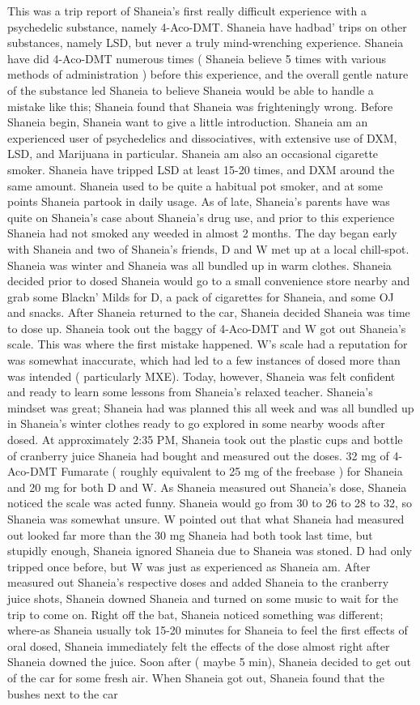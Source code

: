 \documentclass[12pt]{book}
\begin{document}
This was a trip report of Shaneia's first really difficult experience with a psychedelic substance, namely 4-Aco-DMT. Shaneia have hadbad' trips on other substances, namely LSD, but never a truly mind-wrenching experience. Shaneia have did 4-Aco-DMT numerous times ( Shaneia believe 5 times with various methods of administration ) before this experience, and the overall gentle nature of the substance led Shaneia to believe Shaneia would be able to handle a mistake like this; Shaneia found that Shaneia was frighteningly wrong. Before Shaneia begin, Shaneia want to give a little introduction. Shaneia am an experienced user of psychedelics and dissociatives, with extensive use of DXM, LSD, and Marijuana in particular. Shaneia am also an occasional cigarette smoker. Shaneia have tripped LSD at least 15-20 times, and DXM around the same amount. Shaneia used to be quite a habitual pot smoker, and at some points Shaneia partook in daily usage. As of late, Shaneia's parents have was quite on Shaneia's case about Shaneia's drug use, and prior to this experience Shaneia had not smoked any weeded in almost 2 months. The day began early with Shaneia and two of Shaneia's friends, D and W met up at a local chill-spot. Shaneia was winter and Shaneia was all bundled up in warm clothes. Shaneia decided prior to dosed Shaneia would go to a small convenience store nearby and grab some Blackn' Milds for D, a pack of cigarettes for Shaneia, and some OJ and snacks. After Shaneia returned to the car, Shaneia decided Shaneia was time to dose up. Shaneia took out the baggy of 4-Aco-DMT and W got out Shaneia's scale. This was where the first mistake happened. W's scale had a reputation for was somewhat inaccurate, which had led to a few instances of dosed more than was intended ( particularly MXE). Today, however, Shaneia was felt confident and ready to learn some lessons from Shaneia's relaxed teacher. Shaneia's mindset was great; Shaneia had was planned this all week and was all bundled up in Shaneia's winter clothes ready to go explored in some nearby woods after dosed. At approximately 2:35 PM, Shaneia took out the plastic cups and bottle of cranberry juice Shaneia had bought and measured out the doses. 32 mg of 4-Aco-DMT Fumarate ( roughly equivalent to 25 mg of the freebase ) for Shaneia and 20 mg for both D and W. As Shaneia measured out Shaneia's dose, Shaneia noticed the scale was acted funny. Shaneia would go from 30 to 26 to 28 to 32, so Shaneia was somewhat unsure. W pointed out that what Shaneia had measured out looked far more than the 30 mg Shaneia had both took last time, but stupidly enough, Shaneia ignored Shaneia due to Shaneia was stoned. D had only tripped once before, but W was just as experienced as Shaneia am. After measured out Shaneia's respective doses and added Shaneia to the cranberry juice shots, Shaneia downed Shaneia and turned on some music to wait for the trip to come on. Right off the bat, Shaneia noticed something was different; where-as Shaneia usually tok 15-20 minutes for Shaneia to feel the first effects of oral dosed, Shaneia immediately felt the effects of the dose almost right after Shaneia downed the juice. Soon after ( maybe 5 min), Shaneia decided to get out of the car for some fresh air. When Shaneia got out, Shaneia found that the bushes next to the car 
\end{document}
